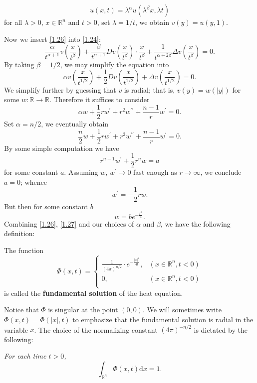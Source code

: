 $$
u\left( x,t \right) =\lambda ^{\alpha}u\left( \lambda ^{\beta}x,\lambda t \right) 
$$
for all $\lambda>0$, $x\in\mathbb{R}^n$ and $t>0$, set $\lambda=1/t$, we obtain $v(y)=u(y,1)$.\par
Now we insert \eqref{1.26} into \eqref{1.24}: 
$$
\frac{\alpha}{t^{\alpha +1}}v\left( \frac{x}{t^{\beta}} \right) +\frac{\beta}{t^{\alpha +1}}Dv\left( \frac{x}{t^{\beta}} \right) \cdot \frac{x}{t^{\beta}}+\frac{1}{t^{\alpha +2\beta}}\Delta v\left( \frac{x}{t^{\beta}} \right) =0.
$$
By taking $\beta=1/2$, we may simplify the equation into 
$$
\alpha v\left( \frac{x}{t^{1/2}} \right) +\frac{1}{2}Dv\left( \frac{x}{t^{1/2}} \right) +\Delta v\left( \frac{x}{t^{1/2}} \right) =0.
$$
We simplify further by guessing that $v$ is radial; that is, $v(y)=w(|y|)$ for some $w:\mathbb{R}\to\mathbb{R}$. Therefore it suffices to consider 
$$
\alpha w+\frac{1}{2}rw^{\prime}+r^2w^{\prime\prime}+\frac{n-1}{r}w^{\prime}=0.
$$
Set $\alpha=n/2$, we eventually obtain 
$$
\frac{n}{2}w+\frac{1}{2}rw^{\prime}+r^2w^{\prime\prime}+\frac{n-1}{r}w^{\prime}=0.
$$
By some simple computation we have 
$$
r^{n-1}w^{\prime}+\frac{1}{2}r^nw=a
$$
for some constant $a$. Assuming $w$, $w^\prime\to 0$ fast enough as $r\to\infty$, we conclude $a=0$; whence 
$$
w^{\prime}=-\frac{1}{2}rw.
$$
But then for some constant $b$ 
\begin{equation}\label{1.27}
w=be^{-\frac{r^2}{4}}.
\end{equation}
Combining \eqref{1.26}, \eqref{1.27} and our choices of $\alpha$ and $\beta$, we have the following definition: 
\begin{definition}
The function 
$$
\Phi \left( x,t \right) =\left\{ \begin{aligned}
	\frac{1}{\left( 4\pi \right) ^{n/2}}\cdot e^{-\frac{\left| x \right|^2}{4t}},&\left( x\in \mathbb{R} ^n,t<0 \right)\\
	0,&\left( x\in \mathbb{R} ^n,t<0 \right)\\
\end{aligned} \right. 
$$
is called the \textbf{fundamental solution} of the heat equation.
\end{definition}
Notice that $\Phi$ is singular at the point $(0,0)$. We will sometimes write $\Phi(x,t)=\Phi(|x|,t)$ to emphasize that the fundamental solution is radial in the variable $x$. The choice of the normalizing constant $(4\pi)^{-n/2}$ is dictated by the following: 
\begin{lemma}\em
For each time $t>0$, 
$$\int_{\mathbb{R}^n}\Phi(x,t)\mathrm{d}x=1.$$
\end{lemma}
